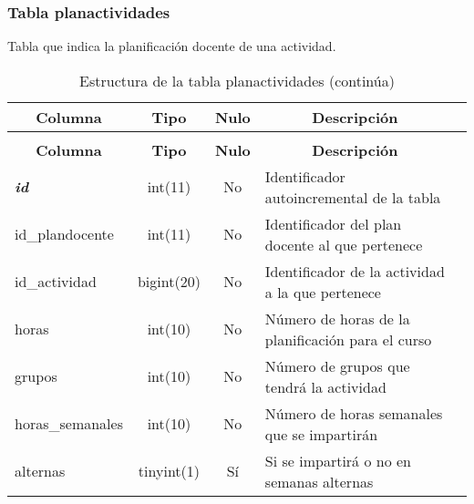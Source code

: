 \subsubsection{Tabla planactividades}
Tabla que indica la planificación docente de una actividad.
%
%
 \begin{longtable}{|l|c|c|l|l|} 
 \caption{Estructura de la tabla planactividades} \label{tab:planactividades-structure} \\
 \hline \multicolumn{1}{|c|}{\textbf{Columna}} & \multicolumn{1}{|c|}{\textbf{Tipo}} & \multicolumn{1}{|c|}{\textbf{Nulo}} & \multicolumn{1}{|c|}{\textbf{Descripción}} \\ \hline \hline
\endfirsthead
 \caption{Estructura de la tabla planactividades (continúa)} \\ 
 \hline \multicolumn{1}{|c|}{\textbf{Columna}} & \multicolumn{1}{|c|}{\textbf{Tipo}} & \multicolumn{1}{|c|}{\textbf{Nulo}} & \multicolumn{1}{|c|}{\textbf{Descripción}}  \\ \hline \hline \endhead \endfoot 
\textbf{\textit{id}} & int(11) & No & Identificador autoincremental de la tabla \\ \hline 
id\_plandocente & int(11) & No & Identificador del plan docente al que pertenece \\ \hline 
id\_actividad & bigint(20)  & No &  Identificador de la actividad a la que pertenece \\ \hline 
horas & int(10)  & No & Número de horas de la planificación para el curso \\ \hline 
grupos & int(10)  & No & Número de grupos que tendrá la actividad \\ \hline 
horas\_semanales & int(10)  & No & Número de horas semanales que se impartirán \\ \hline 
alternas & tinyint(1) & Sí & Si se impartirá o no en semanas alternas \\ \hline 
 \end{longtable}

